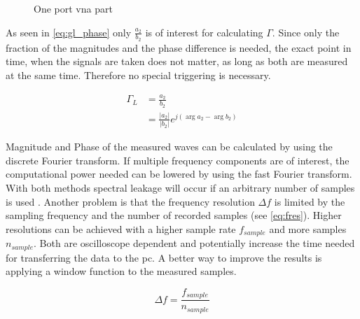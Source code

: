 \documentclass[12pt,a4paper,parskip=full,abstract=true,BCOR=10mm,twoside,open=right]{scrreprt}
\providecommand{\abs}[1]{\lvert#1\rvert}
\begin{document}
\begin{figure}[htb]
    \caption{One port \gls{vna} part}
    \label{fig:vna_part}
\end{figure}

As seen in \cref{eq:gl_phase} only $\frac{a_2}{b_2}$ is
of interest for calculating $\Gamma$. Since only the fraction of the magnitudes
and the phase difference is needed, the exact point in time, when the signals are
taken does not matter, as long as both are measured at the same time. Therefore
no special triggering is necessary.

\begin{equation}\label{eq:gl_phase}
    \begin{split}
        \Gamma_L & = \frac{a_2}{b_2} \\
                 & = \frac{\abs{a_2}}{\abs{b_2}} e^{j(\arg{a_2}-\arg{b_2})}
    \end{split}
\end{equation}

Magnitude and Phase of the measured waves can be calculated by using
the discrete Fourier transform. If multiple frequency components are of interest, the computational
power needed can be lowered by using the fast Fourier transform. With both methods
spectral leakage will occur if an arbitrary number of samples is used \cite{harris_use_1978}.
Another problem is that the frequency resolution $\Delta{}f$ is limited by the sampling
frequency and the number of recorded samples (see \cref{eq:fres}). Higher resolutions
can be achieved with a higher sample rate $f_{sample}$ and more samples $n_{sample}$. Both are oscilloscope
dependent and potentially increase the time needed for transferring the data to the
\gls{pc}. A better way to improve the results is applying a window function to the
measured samples.

\begin{equation}
    \label{eq:fres} \Delta{}f = \frac{f_{sample}}{n_{sample}}
\end{equation}
\end{document}
